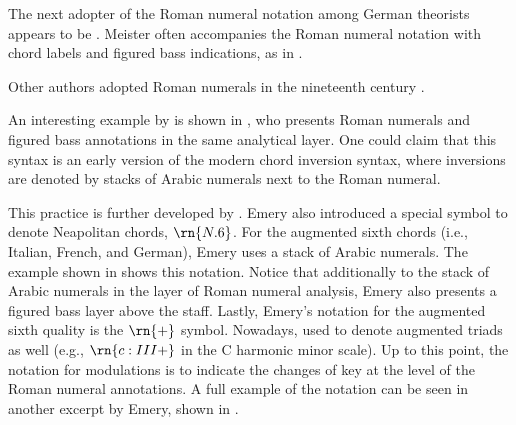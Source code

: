 
The next adopter of the Roman numeral notation among German
theorists appears to be \textcite{meister1852vollstandige}.
Meister often accompanies the Roman numeral notation with
chord labels and figured bass indications, as in
.


Other authors adopted Roman numerals in the nineteenth
century \parencite{sechter1853grundsatze,
richter1860lehrbuch, tiersch1874elementarbuch,
tracy1878theory}.

An interesting example by \textcite{bussler1878praktische}
is shown in
, who
presents Roman numerals and figured bass annotations in the
same analytical layer. One could claim that this syntax is
an early version of the modern chord inversion syntax, where
inversions are denoted by stacks of Arabic numerals next to
the Roman numeral.


This practice is further developed by
\textcite{emery1879elements}. Emery also introduced a
special symbol to denote Neapolitan chords, $\rn{N.6}$. For
the augmented sixth chords (i.e., Italian, French, and
German), Emery uses a stack of Arabic numerals. The example
shown in  shows
this notation. Notice that additionally to the stack of
Arabic numerals in the layer of Roman numeral analysis,
Emery also presents a figured bass layer above the staff.
Lastly, Emery's notation for the augmented sixth quality is
the $\rn{+}$ symbol. Nowadays, used to denote augmented
triads as well (e.g., $\rn{c:III+}$ in the C harmonic minor
scale). Up to this point, the notation for modulations is to
indicate the changes of key at the level of the Roman
numeral annotations. A full example of the notation can be
seen in another excerpt by Emery, shown in
.

